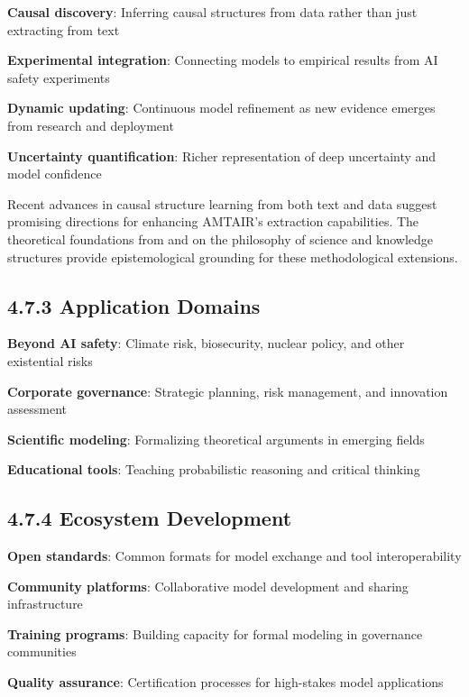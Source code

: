 \documentclass[
  11pt,
  letterpaper,
]{book}
\begin{document}
\textbf{Causal discovery}: Inferring causal structures from data rather
than just extracting from text

\textbf{Experimental integration}: Connecting models to empirical
results from AI safety experiments

\textbf{Dynamic updating}: Continuous model refinement as new evidence
emerges from research and deployment

\textbf{Uncertainty quantification}: Richer representation of deep
uncertainty and model confidence

Recent advances in causal structure learning from both text and data
\textcite{babakov2025} \textcite{ban2023} \textcite{bethard2007}
\textcite{chen2023} \textcite{heinze-deml2018} \textcite{squires2023}
\textcite{yang2022} suggest promising directions for enhancing AMTAIR's
extraction capabilities. The theoretical foundations from
\textcite{duhem1954} and \textcite{meyer2022b} on the philosophy of
science and knowledge structures provide epistemological grounding for
these methodological extensions.

\subsection{4.7.3 Application Domains}\label{sec-application-future}

\textbf{Beyond AI safety}: Climate risk, biosecurity, nuclear policy,
and other existential risks

\textbf{Corporate governance}: Strategic planning, risk management, and
innovation assessment

\textbf{Scientific modeling}: Formalizing theoretical arguments in
emerging fields

\textbf{Educational tools}: Teaching probabilistic reasoning and
critical thinking

\subsection{4.7.4 Ecosystem Development}\label{sec-ecosystem-future}

\textbf{Open standards}: Common formats for model exchange and tool
interoperability

\textbf{Community platforms}: Collaborative model development and
sharing infrastructure

\textbf{Training programs}: Building capacity for formal modeling in
governance communities

\textbf{Quality assurance}: Certification processes for high-stakes
model applications
\end{document}
